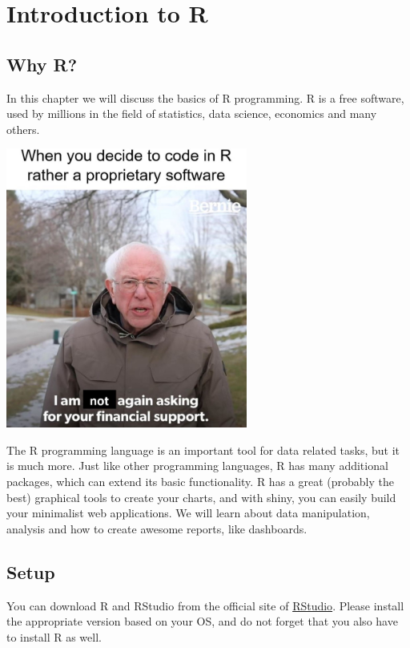 \documentclass[
]{article}
\begin{document}
\hypertarget{seminar1}{%
\section{Introduction to R}\label{seminar1}}

\hypertarget{why-r}{%
\subsection{Why R?}\label{why-r}}

In this chapter we will discuss the basics of R programming.
R is a free software, used by millions in the field of statistics, data science, economics and many others.

\href{https://www.facebook.com/Rmemes0/photos/a.1230204967031792/2971372822914989/}{\includegraphics[width=3.125in,height=\textheight]{images/meme_free.jpg}}

The R programming language is an important tool for data related tasks, but it is much more.
Just like other programming languages, R has many additional packages, which can extend its basic functionality.
R has a great (probably the best) graphical tools to create your charts, and with shiny, you can easily build your minimalist web applications.
We will learn about data manipulation, analysis and how to create awesome reports, like dashboards.

\hypertarget{layout}{%
\subsection{Setup}\label{layout}}

You can download R and RStudio from the official site of \href{https://www.rstudio.com/products/rstudio/download/\#download}{RStudio}.
Please install the appropriate version based on your OS, and do not forget that you also have to install R as well.
\end{document}
